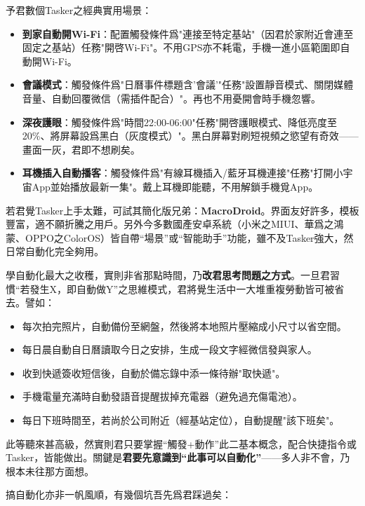 予君數個Tasker之經典實用場景：

\begin{itemize}
  \item \textbf{到家自動開Wi-Fi}：配置觸發條件爲"連接至特定基站"（因君於家附近會連至固定之基站）任務"開啓Wi-Fi"。不用GPS亦不耗電，手機一進小區範圍即自動開Wi-Fi。
  \item \textbf{會議模式}：觸發條件爲"日曆事件標題含'會議'"任務"設置靜音模式、關閉媒體音量、自動回覆微信（需插件配合）"。再也不用憂開會時手機忽響。
  \item \textbf{深夜護眼}：觸發條件爲"時間22:00-06:00"任務"開啓護眼模式、降低亮度至20\%、將屏幕設爲黑白（灰度模式）"。黑白屏幕對刷短視頻之慾望有奇效——畫面一灰，君即不想刷矣。
  \item \textbf{耳機插入自動播客}：觸發條件爲"有線耳機插入/藍牙耳機連接"任務"打開小宇宙App並始播放最新一集"。戴上耳機即能聽，不用解鎖手機覓App。
\end{itemize}

若君覺Tasker上手太難，可試其簡化版兄弟：\textbf{MacroDroid}。界面友好許多，模板豐富，適不願折騰之用戶。另外今多數國產安卓系統（小米之MIUI、華爲之鴻蒙、OPPO之ColorOS）皆自帶“場景”或“智能助手”功能，雖不及Tasker強大，然日常自動化完全夠用。


學自動化最大之收穫，實則非省那點時間，乃\textbf{改君思考問題之方式}。一旦君習慣“若發生X，即自動做Y”之思維模式，君將覺生活中一大堆重複勞動皆可被省去。譬如：

\begin{itemize}
  \item 每次拍完照片，自動備份至網盤，然後將本地照片壓縮成小尺寸以省空間。
  \item 每日晨自動自日曆讀取今日之安排，生成一段文字經微信發與家人。
  \item 收到快遞簽收短信後，自動於備忘錄中添一條待辦"取快遞"。
  \item 手機電量充滿時自動發語音提醒拔掉充電器（避免過充傷電池）。
  \item 每日下班時間至，若尚於公司附近（經基站定位），自動提醒"該下班矣"。
\end{itemize}

此等聽來甚高級，然實則君只要掌握“觸發+動作”此二基本概念，配合快捷指令或Tasker，皆能做出。關鍵是\textbf{君要先意識到“此事可以自動化”}——多人非不會，乃根本未往那方面想。


搞自動化亦非一帆風順，有幾個坑吾先爲君踩過矣：

